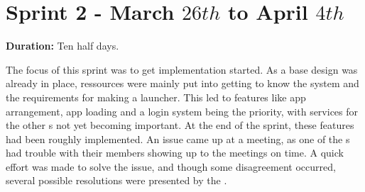 \section{Sprint 2 - March $26th$ to April $4th$}

\textbf{Duration:} Ten half days. \newline

The focus of this sprint was to get implementation started. 
As a base design was already in place, ressources were mainly put into getting to know the system and the requirements for making a launcher. 
This led to features like app arrangement, app loading and a login system being the priority, with services for the other \localgroup{}s not yet becoming important. 
At the end of the sprint, these features had been roughly implemented. \newline
An issue came up at a meeting, as one of the \localgroup{}s had trouble with their members showing up to the meetings on time. 
A quick effort was made to solve the issue, and though some disagreement occurred, several possible resolutions were presented by the \globalgroup{}.